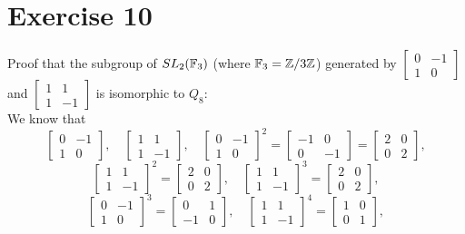 \documentclass[12pt]{article}
\begin{document}
    \section*{Exercise 10}
    Proof that the subgroup of $SL_2(\mathbb{F}_3)$
    (where $\mathbb{F}_3 = \mathbb{Z}/3\mathbb{Z}$)
    generated by $\begin{bmatrix} 0 & -1 \\ 1 & 0 \end{bmatrix}$
    and $\begin{bmatrix} 1 & 1 \\ 1 & -1 \end{bmatrix}$
    is isomorphic to $Q_8$: \\
    We know that 
    \[ \begin{bmatrix} 0 & -1 \\ 1 & 0 \end{bmatrix}, \quad
        \begin{bmatrix} 1 & 1 \\ 1 & -1 \end{bmatrix}, \quad
        \begin{bmatrix} 0 & -1 \\ 1 & 0 \end{bmatrix}^2
        = \begin{bmatrix} -1 & 0 \\ 0 & -1 \end{bmatrix}
        = \begin{bmatrix} 2 & 0 \\ 0 & 2 \end{bmatrix}, \] 
    \[ \begin{bmatrix} 1 & 1 \\ 1 & -1 \end{bmatrix}^2
    = \begin{bmatrix} 2 & 0 \\ 0 & 2 \end{bmatrix}, \quad
    \begin{bmatrix} 1 & 1 \\ 1 & -1 \end{bmatrix}^3
    = \begin{bmatrix} 2 & 0 \\ 0 & 2 \end{bmatrix}, \]
    \[ \begin{bmatrix} 0 & -1 \\ 1 & 0 \end{bmatrix}^3
    = \begin{bmatrix} 0 & 1 \\ -1 & 0 \end{bmatrix}, \quad
    \begin{bmatrix} 1 & 1 \\ 1 & -1 \end{bmatrix}^4
    = \begin{bmatrix} 1 & 0 \\ 0 & 1 \end{bmatrix}, \] 
\end{document}
